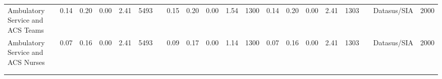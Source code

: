 \begin{sidewaystable}
\begin{table}[H]
\begin{footnotesize}
\begin{center}
{\begin{threeparttable}[b]
\begin{tabular}{rrrrrrrrrrrrrrrrrrrr}
    \multicolumn{1}{l}{Ambulatory Service and ACS Teams} & \multicolumn{1}{c}{0.14} & \multicolumn{1}{c}{0.20} & \multicolumn{1}{c}{0.00} & \multicolumn{1}{c}{2.41} & \multicolumn{1}{c}{5493} &       & \multicolumn{1}{c}{0.15} & \multicolumn{1}{c}{0.20} & \multicolumn{1}{c}{0.00} & \multicolumn{1}{c}{1.54} & \multicolumn{1}{c}{1300} & \multicolumn{1}{c}{0.14} & \multicolumn{1}{c}{0.20} & \multicolumn{1}{c}{0.00} & \multicolumn{1}{c}{2.41} & \multicolumn{1}{c}{1303} &       & \multicolumn{1}{c}{Datasus/SIA} & \multicolumn{1}{c}{2000} \\
    \multicolumn{1}{l}{Ambulatory Service and ACS Nurses} & \multicolumn{1}{c}{0.07} & \multicolumn{1}{c}{0.16} & \multicolumn{1}{c}{0.00} & \multicolumn{1}{c}{2.41} & \multicolumn{1}{c}{5493} &       & \multicolumn{1}{c}{0.09} & \multicolumn{1}{c}{0.17} & \multicolumn{1}{c}{0.00} & \multicolumn{1}{c}{1.14} & \multicolumn{1}{c}{1300} & \multicolumn{1}{c}{0.07} & \multicolumn{1}{c}{0.16} & \multicolumn{1}{c}{0.00} & \multicolumn{1}{c}{2.41} & \multicolumn{1}{c}{1303} &       & \multicolumn{1}{c}{Datasus/SIA} & \multicolumn{1}{c}{2000} \\
          &       &       &       &       &       &       &       &       &       &       &       &       &       &       &       &       &       &       &  \\
    \midrule
    \midrule
          &       &       &       &       &       &       &       &       &       &       &       &       &       &       &       &       &       &       &  \\
    \end{tabular}%
    



\end{threeparttable}
}
\end{center}
\end{footnotesize}
\end{table}
\end{sidewaystable}